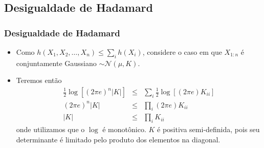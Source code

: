 \subsection{Desigualdade de Hadamard}
\begin{frame}[allowframebreaks]
  \frametitle{Desigualdade de Hadamard}
  \begin{itemize}
  \item Como $h(X_1, X_2, \ldots, X_n) \leq \sum_i h(X_i)$, considere o caso em que $X_{1:n}$ é
	conjuntamente Gaussiano $\sim \mathcal{N}(\mu,K)$.
  \item Teremos então
	\begin{eqnarray}
	\frac{1}{2} \log \left[ (2 \pi e)^n \vert K \vert \right] &\leq& \sum_i \frac{1}{2} \log \left[ (2 \pi e) K_{ii} \right] \\
	(2 \pi e)^n \vert K \vert  &\leq& \prod_i (2 \pi e) K_{ii} \\
	\vert K \vert  &\leq&  \prod_i K_{ii}
	\end{eqnarray}
	onde utilizamos que o $\log$ é monotônico. $K$ é positiva semi-definida, pois seu 
	determinante é limitado pelo produto dos elementos na diagonal.
  \end{itemize}
\end{frame}


